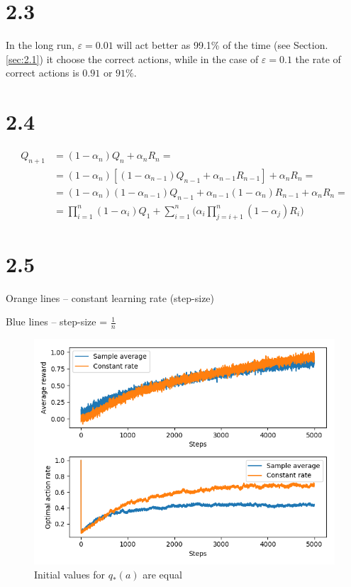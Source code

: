 \documentclass[12pt, a4paper]{article}
\begin{document}
    \section{2.3}
        In the long run, $\varepsilon = 0.01$ will act better as 99.1\% of the time (see Section.
        \ref{sec:2.1}) it choose the correct actions, while in the case of $\varepsilon = 0.1$
        the rate of correct actions is $0.91 \text{ or } 91\%$.

    \section{2.4}
        \begin{align*}
            Q_{n+1} &= (1 - \alpha_n)Q_n + \alpha_n R_n =\\
                    &= (1 - \alpha_n) [(1 - \alpha_{n-1})Q_{n-1} + \alpha_{n-1}R_{n-1}] + \alpha_n R_n =\\
                    &= (1 - \alpha_n) (1 - \alpha_{n-1}) Q_{n-1} + \alpha_{n-1}(1 - \alpha_n) R_{n-1} + \alpha_n R_n =\\
                    &=\prod_{i=1}^n(1-\alpha_i)Q_1 + \sum_{i=1}^n\Big(\alpha_i \prod_{j=i+1}^n(1-\alpha_j)R_i\Big)
        \end{align*}

    \section{2.5}
        Orange lines -- constant learning rate (step-size)

        Blue lines -- step-size = $\frac{1}{n}$

        \begin{figure}[H]
            \centering
            \includegraphics[width=0.8\linewidth]{1.png}
            \caption{Initial values for $q_*(a)$ are equal}
        \end{figure}
\end{document}
